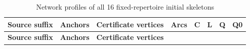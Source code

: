 \documentclass[pdflatex,sn-basic,Numbered]{sn-jnl}
\begin{document}
\begin{longtable}[]{@{}
  >{\raggedright\arraybackslash}p{}
  >{\raggedleft\arraybackslash}p{}
  >{\raggedleft\arraybackslash}p{}
  >{\raggedleft\arraybackslash}p{}
  >{\raggedleft\arraybackslash}p{}
  >{\raggedleft\arraybackslash}p{}
  >{\raggedleft\arraybackslash}p{}
  >{\raggedleft\arraybackslash}p{}@{}}
\caption{Network profiles of all 16 fixed-repertoire initial skeletons}\label{tab:39}\tabularnewline
\toprule\noalign{}
\begin{minipage}[b]{\linewidth}\raggedright
\textbf{Source suffix}
\end{minipage} & \begin{minipage}[b]{\linewidth}\raggedleft
\textbf{Anchors}
\end{minipage} & \begin{minipage}[b]{\linewidth}\raggedleft
\textbf{Certificate vertices}
\end{minipage} & \begin{minipage}[b]{\linewidth}\raggedleft
\textbf{Arcs}
\end{minipage} & \begin{minipage}[b]{\linewidth}\raggedleft
\textbf{C}
\end{minipage} & \begin{minipage}[b]{\linewidth}\raggedleft
\textbf{L}
\end{minipage} & \begin{minipage}[b]{\linewidth}\raggedleft
\textbf{Q}
\end{minipage} & \begin{minipage}[b]{\linewidth}\raggedleft
\textbf{Q0}
\end{minipage} \\
\midrule\noalign{}
\endfirsthead
\toprule\noalign{}
\begin{minipage}[b]{\linewidth}\raggedright
\textbf{Source suffix}
\end{minipage} & \begin{minipage}[b]{\linewidth}\raggedleft
\textbf{Anchors}
\end{minipage} & \begin{minipage}[b]{\linewidth}\raggedleft
\textbf{Certificate vertices}
\end{minipage} & \begin{minipage}[b]{\linewidth}\raggedleft

\end{minipage}
\end{longtable}
\end{document}
